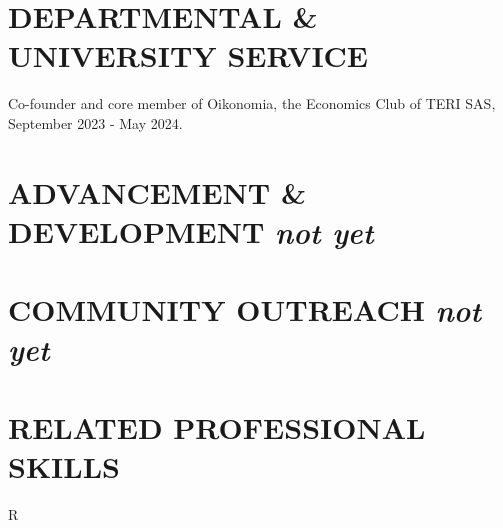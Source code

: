 \documentclass[final, 12pt]{article}
\begin{document}



\section*{DEPARTMENTAL \& UNIVERSITY SERVICE}


 Co-founder and core member of Oikonomia, the Economics Club of TERI SAS, September 2023 - May 2024. \\


\section*{ADVANCEMENT \& DEVELOPMENT \it not yet}





\section*{COMMUNITY OUTREACH \it not yet}




\section*{RELATED PROFESSIONAL SKILLS}



R 
\end{document}
